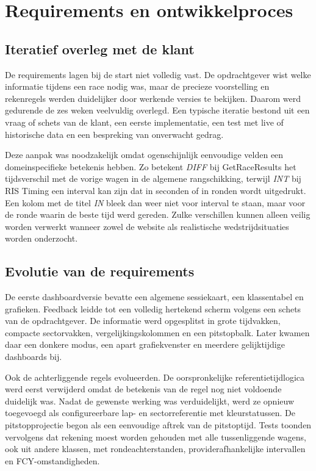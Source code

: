 \chapter{Requirements en ontwikkelproces}
\label{chap:requirements}

\section{Iteratief overleg met de klant}
De requirements lagen bij de start niet volledig vast. De opdrachtgever wist welke informatie tijdens een race nodig was, maar de precieze voorstelling en rekenregels werden duidelijker door werkende versies te bekijken. Daarom werd gedurende de zes weken veelvuldig overlegd. Een typische iteratie bestond uit een vraag of schets van de klant, een eerste implementatie, een test met live of historische data en een bespreking van onverwacht gedrag.

Deze aanpak was noodzakelijk omdat ogenschijnlijk eenvoudige velden een domeinspecifieke betekenis hebben. Zo betekent \emph{DIFF} bij GetRaceResults het tijdsverschil met de vorige wagen in de algemene rangschikking, terwijl \emph{INT} bij RIS Timing een interval kan zijn dat in seconden of in ronden wordt uitgedrukt. Een kolom met de titel \emph{IN} bleek dan weer niet voor interval te staan, maar voor de ronde waarin de beste tijd werd gereden. Zulke verschillen kunnen alleen veilig worden verwerkt wanneer zowel de website als realistische wedstrijdsituaties worden onderzocht.

\section{Evolutie van de requirements}
De eerste dashboardversie bevatte een algemene sessiekaart, een klassentabel en grafieken. Feedback leidde tot een volledig hertekend scherm volgens een schets van de opdrachtgever. De informatie werd opgesplitst in grote tijdvakken, compacte sectorvakken, vergelijkingskolommen en een pitstopbalk. Later kwamen daar een donkere modus, een apart grafiekvenster en meerdere gelijktijdige dashboards bij.

Ook de achterliggende regels evolueerden. De oorspronkelijke referentietijdlogica werd eerst verwijderd omdat de betekenis van de regel nog niet voldoende duidelijk was. Nadat de gewenste werking was verduidelijkt, werd ze opnieuw toegevoegd als configureerbare lap- en sectorreferentie met kleurstatussen. De pitstopprojectie begon als een eenvoudige aftrek van de pitstoptijd. Tests toonden vervolgens dat rekening moest worden gehouden met alle tussenliggende wagens, ook uit andere klassen, met rondeachterstanden, providerafhankelijke intervallen en FCY-omstandigheden.

